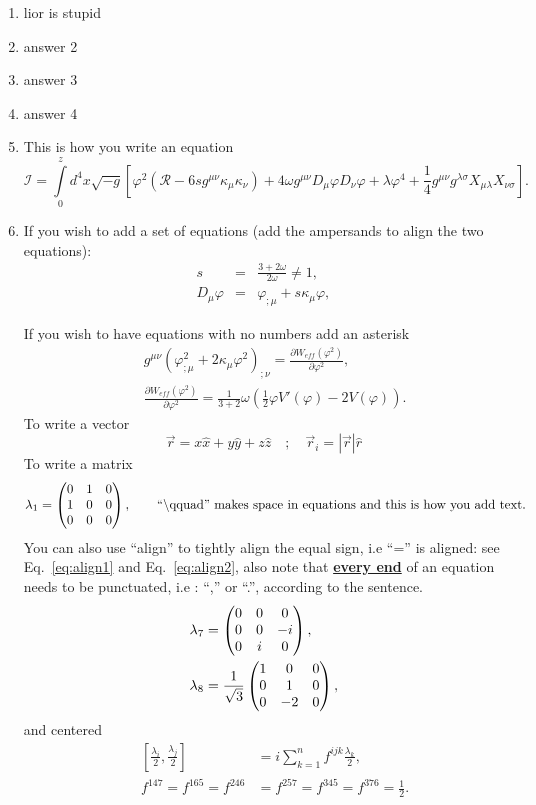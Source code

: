 \documentclass[11pt,fleqn]{article}
\newcommand{\amatrix}[1]{\begin{matrix} #1 \end{matrix}}
\newcommand{\Dn}{\vspace*{3mm}}
\begin{document}
\Dn
\begin{enumerate}
\item lior is stupid
\item answer 2
\item answer 3
\item answer 4
\item This is how you write an equation
\begin{equation}
\mathcal{I} =\int \limits_0^z  d^4x \sqrt{-g}\left[\varphi^2\left(\mathcal{R}-6sg^{\mu \nu} \kappa_\mu \kappa_\nu\right) + 4 \omega g^{\mu \nu}D_\mu \varphi D_\nu \varphi + \lambda \varphi^4 + \frac{1}{4}g^{\mu \nu} g^{\lambda \sigma}X_{\mu \lambda}X_{\nu \sigma}\right].
\end{equation}

\item If you wish to add a set of equations (add the ampersands to align the two equations):
\begin{eqnarray}
 s &=& \frac{3+2\omega}{2\omega}\neq 1,\\
 D_\mu \varphi &=& \varphi_{;\mu} + s \kappa_\mu \varphi,
\end{eqnarray}

If you wish to have equations with no numbers add an asterisk
\begin{eqnarray*}
&& g^{\mu \nu} \left( \varphi^2_{;\mu} + 2 \kappa_\mu \varphi^2\right)_{;\nu} = \frac{\partial W_{eff}(\varphi^2)}{\partial \varphi^2}, \\
&& \frac{\partial W_{eff}(\varphi^2)}{\partial \varphi^2} = \frac{1}{3+ 2} \omega \left(\frac{1}{2} \varphi V'(\varphi) - 2V(\varphi)\right).
\end{eqnarray*}
To write a vector
\begin{equation}
\vec{r} = x \hat{x} + y \hat{y} + z\hat{z} \quad ; \quad \vec{r}_i
= \left|\vec{r}\right|\hat{r} \end{equation}
To write a matrix
\begin{equation}
\lambda_1 
= \left( \amatrix { 0 & 1 & 0 \cr 1 & 0 & 0 \cr 0 & 0 & 0}\right), \text{\qquad ``\textbackslash qquad'' makes space in equations and this is how you add text.}
\end{equation}
You can also use ``align'' to tightly align the equal sign, i.e ``='' is aligned: see Eq.~\eqref{eq:align1} and Eq.~\eqref{eq:align2},  also note that {\underline{\bf every end}} of an  equation needs to be punctuated, i.e : ``,'' or ``.'', according to the sentence. 
\begin{align}
\lambda_7 
&= \left( \amatrix { 0 & 0 & 0 \cr 0 & 0 & -i \cr 0 & i & 0}\right), \label{eq:align1}\\
 \lambda_8 
&= \frac{1}{\sqrt{3}}\left( \amatrix { 1 & 0 & 0 \cr 0 & 1 & 0 \cr 0 & -2 & 0}\right),\label{eq:align2}
\end{align}
and centered
\begin{align*}
&&\left[\frac{\lambda_i}{2},\frac{\lambda_j}{2}\right] &= i \displaystyle\sum_{k=1}^{n} f^{ijk}\frac{\lambda_k}{2}, \\
&&f^{147}=f^{165}=f^{246}&=f^{257}=f^{345}=f^{376}= \frac{1}{2}.
\end{align*}


\end{enumerate}
\end{document}
